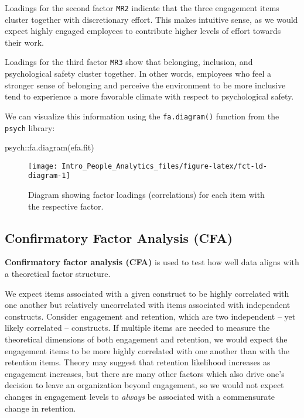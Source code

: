 \documentclass[
]{book}
\newenvironment{Shaded}{\begin{snugshade}}{\end{snugshade}}
\newcommand{\FunctionTok}[1]{\textcolor[rgb]{0.00,0.00,0.00}{#1}}
\newcommand{\NormalTok}[1]{#1}
\newcommand{\SpecialCharTok}[1]{\textcolor[rgb]{0.00,0.00,0.00}{#1}}
\begin{document}
Loadings for the second factor \texttt{MR2} indicate that the three engagement items cluster together with discretionary effort. This makes intuitive sense, as we would expect highly engaged employees to contribute higher levels of effort towards their work.

Loadings for the third factor \texttt{MR3} show that belonging, inclusion, and psychological safety cluster together. In other words, employees who feel a stronger sense of belonging and perceive the environment to be more inclusive tend to experience a more favorable climate with respect to psychological safety.

We can visualize this information using the \texttt{fa.diagram()} function from the \texttt{psych} library:

\begin{Shaded}
\begin{Highlighting}[]
\NormalTok{psych}\SpecialCharTok{::}\FunctionTok{fa.diagram}\NormalTok{(efa.fit)}
\end{Highlighting}
\end{Shaded}

\begin{figure}

{\centering \texttt{[image: Intro\_People\_Analytics\_files/figure-latex/fct-ld-diagram-1]} 

}

\caption{Diagram showing factor loadings (correlations) for each item with the respective factor.}\label{fig:fct-ld-diagram}
\end{figure}

\hypertarget{confirmatory-factor-analysis-cfa}{%
\subsection{Confirmatory Factor Analysis (CFA)}\label{confirmatory-factor-analysis-cfa}}

\textbf{Confirmatory factor analysis (CFA)} is used to test how well data aligns with a theoretical factor structure.

We expect items associated with a given construct to be highly correlated with one another but relatively uncorrelated with items associated with independent constructs. Consider engagement and retention, which are two independent -- yet likely correlated -- constructs. If multiple items are needed to measure the theoretical dimensions of both engagement and retention, we would expect the engagement items to be more highly correlated with one another than with the retention items. Theory may suggest that retention likelihood increases as engagement increases, but there are many other factors which also drive one's decision to leave an organization beyond engagement, so we would not expect changes in engagement levels to \emph{always} be associated with a commensurate change in retention.
\end{document}
